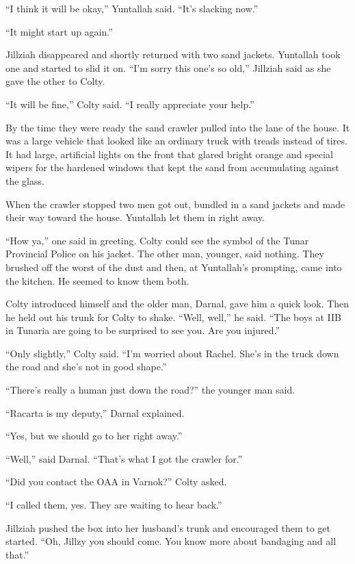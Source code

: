 ``I think it will be okay,'' Yuntallah said. ``It's slacking now.''

``It might start up again.''

Jillziah disappeared and shortly returned with two sand jackets. Yuntallah took one and started
to slid it on. ``I'm sorry this one's so old,'' Jillziah said as she gave the other to Colty.

``It will be fine,'' Colty said. ``I really appreciate your help.''

By the time they were ready the sand crawler pulled into the lane of the house. It was a large
vehicle that looked like an ordinary truck with treads instead of tires. It had large,
artificial lights on the front that glared bright orange and special wipers for the hardened
windows that kept the sand from accumulating against the glass.

When the crawler stopped two men got out, bundled in a sand jackets and made their way toward
the house. Yuntallah let them in right away.

``How ya,'' one said in greeting. Colty could see the symbol of the Tunar Provincial Police on
his jacket. The other man, younger, said nothing. They brushed off the worst of the dust and
then, at Yuntallah's prompting, came into the kitchen. He seemed to know them both.

Colty introduced himself and the older man, Darnal, gave him a quick look. Then he held out his
trunk for Colty to shake. ``Well, well,'' he said. ``The boys at IIB in Tunaria are going to be
surprised to see you. Are you injured.''

``Only slightly,'' Colty said. ``I'm worried about Rachel. She's in the truck down the road and
she's not in good shape.''

``There's really a human just down the road?'' the younger man said.

``Racarta is my deputy,'' Darnal explained.

``Yes, but we should go to her right away.''

``Well,'' said Darnal. ``That's what I got the crawler for.''

``Did you contact the OAA in Varnok?'' Colty asked.

``I called them, yes. They are waiting to hear back.''

Jillziah pushed the box into her husband's trunk and encouraged them to get started. ``Oh,
Jillzy you should come. You know more about bandaging and all that.''

